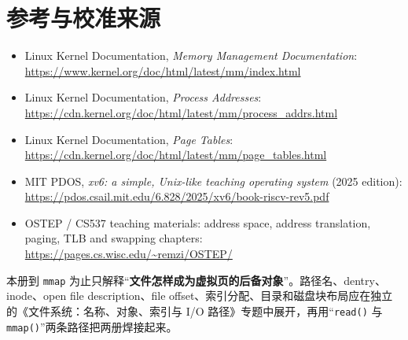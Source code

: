 \documentclass[11pt,a4paper]{ctexart}
\newcommand{\kw}[1]{\textbf{#1}}
\newcommand{\code}[1]{\texttt{#1}}
\begin{document}
\section*{参考与校准来源}
\small
\begin{itemize}
  \item Linux Kernel Documentation, \emph{Memory Management Documentation}: \url{https://www.kernel.org/doc/html/latest/mm/index.html}
  \item Linux Kernel Documentation, \emph{Process Addresses}: \url{https://cdn.kernel.org/doc/html/latest/mm/process_addrs.html}
  \item Linux Kernel Documentation, \emph{Page Tables}: \url{https://cdn.kernel.org/doc/html/latest/mm/page_tables.html}
  \item MIT PDOS, \emph{xv6: a simple, Unix-like teaching operating system} (2025 edition): \url{https://pdos.csail.mit.edu/6.828/2025/xv6/book-riscv-rev5.pdf}
  \item OSTEP / CS537 teaching materials: address space, address translation, paging, TLB and swapping chapters: \url{https://pages.cs.wisc.edu/~remzi/OSTEP/}
\end{itemize}

\begin{method}[下一本专题的接口]
本册到 \code{mmap} 为止只解释“\kw{文件怎样成为虚拟页的后备对象}”。路径名、dentry、inode、open file description、file offset、索引分配、目录和磁盘块布局应在独立的《文件系统：名称、对象、索引与 I/O 路径》专题中展开，再用“\code{read()} 与 \code{mmap()}”两条路径把两册焊接起来。
\end{method}
\end{document}
